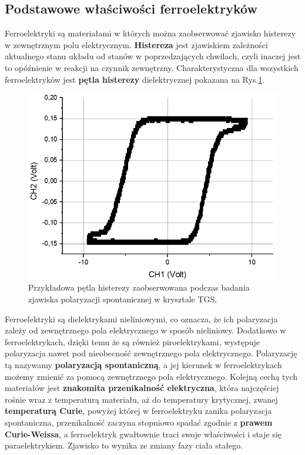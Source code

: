 \documentclass{article}
\begin{document}
\subsection{Podstawowe właściwości ferroelektryków}
Ferroelektryki są materiałami w których można zaobserwować zjawisko histerezy w zewnętrznym polu elektrycznym\cite{histereza}. \textbf{Histereza} jest zjawiskiem zależności aktualnego stanu układu od stanów w poprzedzających chwilach, czyli inaczej jest to opóźnienie w reakcji na czynnik zewnętrzny. Charakterystyczna dla wszystkich ferroelektryków jest \textbf{pętla histerezy} dielektrycznej pokazana na Rys.\ref{fig:histereza}.

\begin{figure}[!h]
	\centering
	\includegraphics[scale=0.3]{histereza.png}
	\caption{Przykładowa pętla histerezy zaobserwowana podczas badania zjawiska polaryzacji spontanicznej w krysztale TGS.}
	\label{fig:histereza}
\end{figure}

Ferroelektryki są dielektrykami nieliniowymi, co oznacza, że ich polaryzacja zależy od zewnętrznego pola elektrycznego w sposób nieliniowy. Dodatkowo w ferroelektrykach, dzięki temu że są również piroelektrykami, występuje polaryzacja nawet pod nieobecność zewnętrznego pola elektrycznego. Polaryzację tą nazywamy \textbf{polaryzacją spontaniczną}, a jej kierunek w ferroelektrykach możemy zmienić za pomocą zewnętrznego pola elektrycznego. Kolejną cechą tych materiałów jest \textbf{znakomita przenikalność elektryczna}, która najczęściej rośnie wraz z temperaturą materiału, aż do temperatury krytycznej, zwanej \textbf{temperaturą Curie}, powyżej której w ferroelektryku zanika polaryzacja spontaniczna, przenikalność zaczyna stopniowo spadać zgodnie z \textbf{prawem Curie-Weissa}\cite{krajewski}, a ferroelektryk gwałtownie traci swoje właściwości i staje się paraelektrykiem. Zjawisko to wynika ze zmiany fazy ciała stałego.
\end{document}
